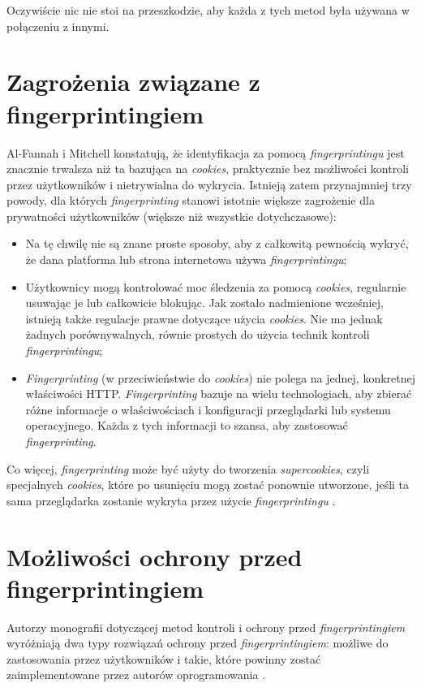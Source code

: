 Oczywiście nic nie stoi na przeszkodzie, aby każda z tych metod była używana w
połączeniu z innymi.

\section{Zagrożenia związane z fingerprintingiem}
Al-Fannah i Mitchell \cite[s. 1]{al2020too} konstatują, że identyfikacja za
pomocą \emph{fingerprintingu} jest znacznie trwalsza niż ta bazująca na
\emph{cookies}, praktycznie bez możliwości kontroli przez użytkowników i
nietrywialna do wykrycia. Istnieją zatem przynajmniej trzy powody, dla których
\emph{fingerprinting} stanowi istotnie większe zagrożenie dla prywatności
użytkowników (większe niż wszystkie dotychczasowe):
\begin{itemize}
	\item Na tę chwilę nie są znane proste sposoby, aby z całkowitą pewnością
	      wykryć, że dana platforma lub strona internetowa używa
	      \emph{fingerprintingu};
	\item Użytkownicy mogą kontrolować moc śledzenia za pomocą \emph{cookies},
	      regularnie usuwając je lub całkowicie blokując. Jak zostało
	      nadmienione wcześniej, istnieją także regulacje prawne dotyczące
	      użycia \emph{cookies}. Nie ma jednak żadnych porównywalnych, równie
	      prostych do użycia technik kontroli \emph{fingerprintingu};
	\item \emph{Fingerprinting} (w przeciwieństwie do \emph{cookies}) nie polega
	      na jednej, konkretnej właściwości HTTP. \emph{Fingerprinting} bazuje
	      na wielu technologiach, aby zbierać różne informacje o właściwościach
	      i konfiguracji przeglądarki lub systemu operacyjnego. Każda z tych
	      informacji to szansa, aby zastosować \emph{fingerprinting}.
\end{itemize}

Co więcej, \emph{fingerprinting} może być użyty do tworzenia
\emph{supercookies}, czyli specjalnych \emph{cookies}, które po usunięciu mogą
zostać ponownie utworzone, jeśli ta sama przeglądarka zostanie wykryta przez
użycie \emph{fingerprintingu} \cite[s. 2]{al2020too}.

\section{Możliwości ochrony przed fingerprintingiem}
Autorzy monografii dotyczącej metod kontroli i ochrony przed
\emph{fingerprintingiem} wyróżniają dwa typy rozwiązań ochrony przed
\emph{fingerprintingiem}: możliwe do zastosowania przez użytkowników i takie,
które powinny zostać zaimplementowane przez autorów oprogramowania
\cite{al2020too}.

